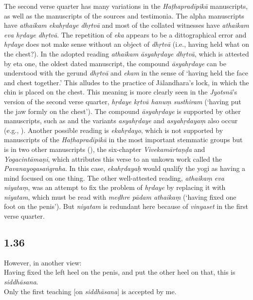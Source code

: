 \begin{ekdosis}
\begin{testimonia}[hp01_035]
\end{testimonia}

\begin{philcomm}[hp01_035]
The second verse quarter has many variations in the \emph{Haṭhapradīpikā} manuscripts, as well as the manuscripts of the sources and testimonia. The alpha manuscripts have \emph{athaikam ekahṛdaye dhṛtvā} and most of the collated witnesses have \emph{athaikam eva hṛdaye dhṛtvā}. The repetition of \emph{eka} appears to be a dittographical error and \emph{hṛdaye} does not make sense without an object of \emph{dhṛtvā} (i.e., having held what on the chest?). In the adopted reading \emph{athaikam āsyahṛdaye dhṛtvā}, which is attested by eta one, the oldest dated manuscript, the compound \emph{āsyahṛdaye} can be understood with the gerund \emph{dhṛtvā} and \emph{ekam} in the sense of `having held the face and chest together.' This alludes to the practice of Jālandhara's lock, in which the chin is placed on the chest. This meaning is more clearly seen in the \emph{Jyotsnā}'s version of the second verse quarter, \emph{hṛdaye kṛtvā hanuṃ susthiram} (`having put the jaw formly on the chest'). The compound \emph{āsyahṛdaye} is supported by other manuscripts, such as  and the variants \emph{asyahṛdaye} and \emph{asyahṛdayaṃ} also occur (e.g., ). Another possible reading is \emph{ekahṛdayo}, which is not supported by manuscripts of the \emph{Haṭhapradīpikā} in the most important stemmatic groups but is in two other manuscripts (), the six-chapter \emph{Vivekamārtaṇḍa} and \emph{Yogacintāmaṇi}, which attributes this verse to an unkown work called the \emph{Pavanayogasaṅgraha}. In this case, \emph{ekahṛdayaḥ} would qualify the yogi as having a mind focused on one thing. The other well-attested reading, \emph{athaikaṃ eva niyataṃ}, was an attempt to fix the problem of \emph{hṛdaye} by replacing it with \emph{niyatam}, which must be read with \emph{meḍhre pādam athaikaṃ} (`having fixed one foot on the penis'). But \emph{niyatam} is redundant here because of \emph{vinyaset} in the first verse quarter.     \end{philcomm}

\subsection*{1.36}
\begin{translation}[hp01_036]
However, in another view:\\
Having fixed the left heel on the penis, and put the other heel on that, this is \emph{siddhāsana}.\\ 
Only the first teaching [on \emph{siddhāsana}] is accepted by me.
\end{translation}


\end{ekdosis}
